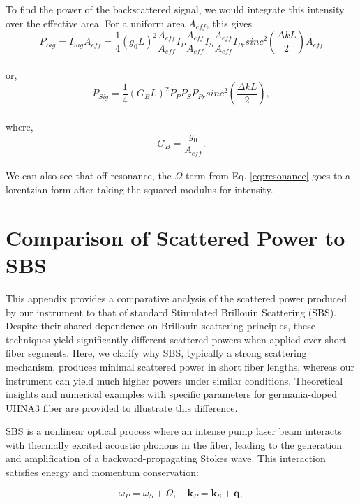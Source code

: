 \documentclass[%
  reprint,
  superscriptaddress,
  amsmath,amssymb,
  aps,
  prapplied,
]{revtex4-2}
\begin{document}
To find the power of the backscattered signal, we would integrate this intensity over the effective area. For a uniform area $A_{eff}$, this gives
\\
\begin{equation}
  P_{Sig} = I_{Sig}A_{eff} = \frac{1}{4}(g_{0}L)^{2}\frac{A_{eff}}{A_{eff}}I_{P}\frac{A_{eff}}{A_{eff}}I_{S}\frac{A_{eff}}{A_{eff}}I_{Pr}sinc^{2}\left(\frac{\Delta kL}{2}\right)A_{eff}
\end{equation}
\\
or,
\\
\begin{equation}
  P_{Sig} = \frac{1}{4}(G_{B}L)^{2}P_{P}P_{S}P_{Pr}sinc^{2}\left(\frac{\Delta kL}{2}\right),
\end{equation}
\\
where,
\\
\begin{equation}
  G_{B} = \frac{g_{0}}{A_{eff}}.
\end{equation}
\\
We can also see that off resonance, the $\Omega$ term from Eq. \ref{eq:resonance} goes to a lorentzian form after taking the squared modulus for intensity.

\newpage


\section{Comparison of Scattered Power to SBS}

This appendix provides a comparative analysis of the scattered power produced by our instrument to that of standard Stimulated Brillouin Scattering (SBS). Despite their shared dependence on Brillouin scattering principles, these techniques yield significantly different scattered powers when applied over short fiber segments. Here, we clarify why SBS, typically a strong scattering mechanism, produces minimal scattered power in short fiber lengths, whereas our instrument can yield much higher powers under similar conditions. Theoretical insights and numerical examples with specific parameters for germania-doped UHNA3 fiber are provided to illustrate this difference.

SBS is a nonlinear optical process where an intense pump laser beam interacts with thermally excited acoustic phonons in the fiber, leading to the generation and amplification of a backward-propagating Stokes wave. This interaction satisfies energy and momentum conservation:

\begin{equation}
\omega_{P} = \omega_{S} + \Omega, \quad \mathbf{k}_{P} = \mathbf{k}_{S} + \mathbf{q},
\end{equation}
\end{document}
